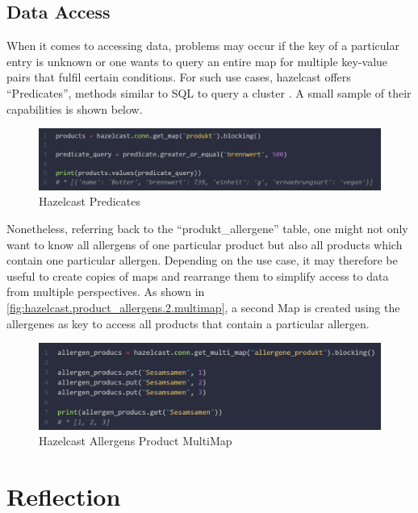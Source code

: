 \subsection{Data Access} \label{subsec:dataAccessHazelcast}

When it comes to accessing data, problems may occur if the key of a particular entry is unknown or one wants
to query an entire map for multiple key-value pairs that fulfil certain conditions. For such use cases,
hazelcast offers \enquote{Predicates}, methods similar to SQL to query a cluster \parencite{Hazelcast.Predicates}.
A small sample of their capabilities is shown below.

\begin{figure}[H]
    \centering
    \caption{Hazelcast Predicates} \label{fig:hazelcast.predicates}
    \includegraphics[width=\textwidth]{images/hazelcast.predicates.png}
\end{figure}

Nonetheless, referring back to the \enquote{produkt\_allergene} table, one might not only want to know all
allergens of one particular product but also all products which contain one particular allergen.
Depending on the use case, it may therefore be useful to create copies of maps and rearrange them
to simplify access to data from multiple perspectives. As shown in
\autoref{fig:hazelcast.product_allergens.2.multimap}, a second Map is created using the allergenes as key
to access all products that contain a particular allergen.

\begin{figure}[H]
    \centering
    \caption{Hazelcast Allergens Product MultiMap} \label{fig:hazelcast.product_allergens.2.multimap}
    \includegraphics[width=\textwidth]{images/hazelcast.product_allergens.multimap.2.png}
\end{figure}

\section{Reflection} \label{sec:reflectionHazelcast}


